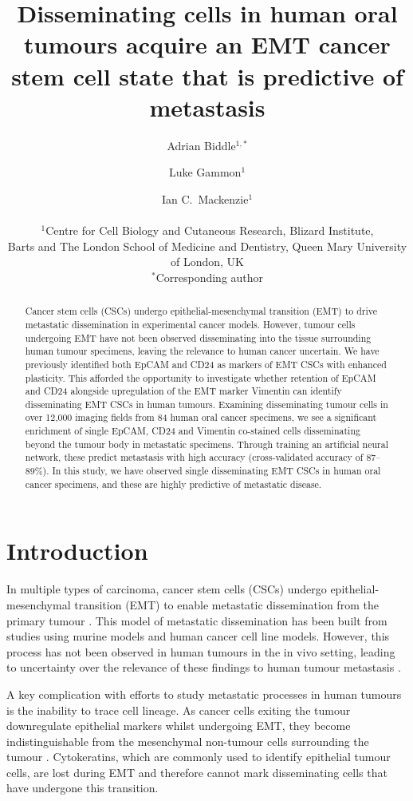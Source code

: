 \documentclass[11pt]{article}
\title{Disseminating cells in human oral tumours acquire an EMT cancer stem cell state that is predictive of metastasis}
\author{
Adrian Biddle$^{1,*}$ \and Luke Gammon$^{1}$ \and Ian C.\ Mackenzie$^{1}$\\
\\
\small $^{1}$Centre for Cell Biology and Cutaneous Research, Blizard Institute,\\
\small Barts and The London School of Medicine and Dentistry, Queen Mary University of London, UK\\
\small $^{*}$Corresponding author
}
\date{}
\begin{document}
\maketitle

\begin{abstract}
Cancer stem cells (CSCs) undergo epithelial-mesenchymal transition (EMT) to drive metastatic dissemination in experimental cancer models. However, tumour cells undergoing EMT have not been observed disseminating into the tissue surrounding human tumour specimens, leaving the relevance to human cancer uncertain. We have previously identified both EpCAM and CD24 as markers of EMT CSCs with enhanced plasticity. This afforded the opportunity to investigate whether retention of EpCAM and CD24 alongside upregulation of the EMT marker Vimentin can identify disseminating EMT CSCs in human tumours. Examining disseminating tumour cells in over 12,000 imaging fields from 84 human oral cancer specimens, we see a significant enrichment of single EpCAM, CD24 and Vimentin co-stained cells disseminating beyond the tumour body in metastatic specimens. Through training an artificial neural network, these predict metastasis with high accuracy (cross-validated accuracy of 87--89\%). In this study, we have observed single disseminating EMT CSCs in human oral cancer specimens, and these are highly predictive of metastatic disease.
\end{abstract}

\section{Introduction}

In multiple types of carcinoma, cancer stem cells (CSCs) undergo epithelial-mesenchymal transition (EMT) to enable metastatic dissemination from the primary tumour \citep{biddle2011,lambert2017}. This model of metastatic dissemination has been built from studies using murine models and human cancer cell line models. However, this process has not been observed in human tumours in the in vivo setting, leading to uncertainty over the relevance of these findings to human tumour metastasis \citep{bill2015,williams2019}.

A key complication with efforts to study metastatic processes in human tumours is the inability to trace cell lineage. As cancer cells exiting the tumour downregulate epithelial markers whilst undergoing EMT, they become indistinguishable from the mesenchymal non-tumour cells surrounding the tumour \citep{li2016}. Cytokeratins, which are commonly used to identify epithelial tumour cells, are lost during EMT and therefore cannot mark disseminating cells that have undergone this transition.
\end{document}
